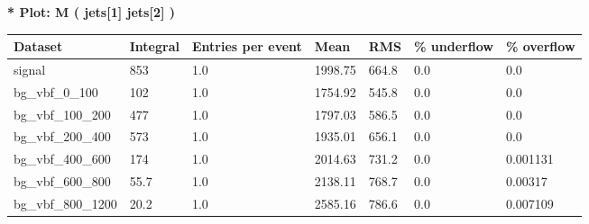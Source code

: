 \documentclass[a4paper, 10pt]{article}
\begin{document}
\textbf{* Plot: M ( jets[1] jets[2] ) }\\
   \begin{table}[H]
  \begin{center}
    \begin{tabular}{|m{23.0mm}|m{23.0mm}|m{18.0mm}|m{19.0mm}|m{19.0mm}|m{19.0mm}|m{19.0mm}|}
      \hline
      {\cellcolor{yellow}         Dataset}& {\cellcolor{yellow}         Integral}& {\cellcolor{yellow}         Entries per event}& {\cellcolor{yellow}         Mean}& {\cellcolor{yellow}         RMS}& {\cellcolor{yellow}         \% underflow}& {\cellcolor{yellow}         \% overflow}\\
      \hline
      {\cellcolor{white}         signal}& {\cellcolor{white}         853}& {\cellcolor{white}         1.0}& {\cellcolor{white}         1998.75}& {\cellcolor{white}         664.8}& {\cellcolor{green}         0.0}& {\cellcolor{green}         0.0}\\
      \hline
      {\cellcolor{white}         bg\_vbf\_0\_100}& {\cellcolor{white}         102}& {\cellcolor{white}         1.0}& {\cellcolor{white}         1754.92}& {\cellcolor{white}         545.8}& {\cellcolor{green}         0.0}& {\cellcolor{green}         0.0}\\
      \hline
      {\cellcolor{white}         bg\_vbf\_100\_200}& {\cellcolor{white}         477}& {\cellcolor{white}         1.0}& {\cellcolor{white}         1797.03}& {\cellcolor{white}         586.5}& {\cellcolor{green}         0.0}& {\cellcolor{green}         0.0}\\
      \hline
      {\cellcolor{white}         bg\_vbf\_200\_400}& {\cellcolor{white}         573}& {\cellcolor{white}         1.0}& {\cellcolor{white}         1935.01}& {\cellcolor{white}         656.1}& {\cellcolor{green}         0.0}& {\cellcolor{green}         0.0}\\
      \hline
      {\cellcolor{white}         bg\_vbf\_400\_600}& {\cellcolor{white}         174}& {\cellcolor{white}         1.0}& {\cellcolor{white}         2014.63}& {\cellcolor{white}         731.2}& {\cellcolor{green}         0.0}& {\cellcolor{green}         0.001131}\\
      \hline
      {\cellcolor{white}         bg\_vbf\_600\_800}& {\cellcolor{white}         55.7}& {\cellcolor{white}         1.0}& {\cellcolor{white}         2138.11}& {\cellcolor{white}         768.7}& {\cellcolor{green}         0.0}& {\cellcolor{green}         0.00317}\\
      \hline
      {\cellcolor{white}         bg\_vbf\_800\_1200}& {\cellcolor{white}         20.2}& {\cellcolor{white}         1.0}& {\cellcolor{white}         2585.16}& {\cellcolor{white}         786.6}& {\cellcolor{green}         0.0}& {\cellcolor{green}         0.007109}\\

\end{tabular}
\end{center}
\end{table}
\end{document}
